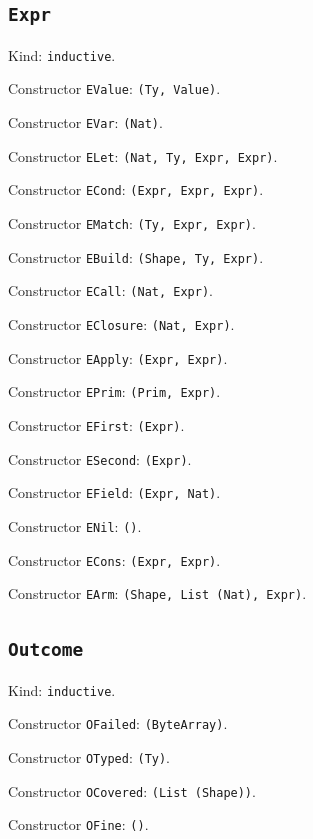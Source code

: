 \documentclass[11pt]{article}
\begin{document}
\subsection*{\texttt{Expr}}
\noindent Kind: \texttt{inductive}.\par
\noindent Constructor \texttt{EValue}: \texttt{(Ty, Value)}.\par
\noindent Constructor \texttt{EVar}: \texttt{(Nat)}.\par
\noindent Constructor \texttt{ELet}: \texttt{(Nat, Ty, Expr, Expr)}.\par
\noindent Constructor \texttt{ECond}: \texttt{(Expr, Expr, Expr)}.\par
\noindent Constructor \texttt{EMatch}: \texttt{(Ty, Expr, Expr)}.\par
\noindent Constructor \texttt{EBuild}: \texttt{(Shape, Ty, Expr)}.\par
\noindent Constructor \texttt{ECall}: \texttt{(Nat, Expr)}.\par
\noindent Constructor \texttt{EClosure}: \texttt{(Nat, Expr)}.\par
\noindent Constructor \texttt{EApply}: \texttt{(Expr, Expr)}.\par
\noindent Constructor \texttt{EPrim}: \texttt{(Prim, Expr)}.\par
\noindent Constructor \texttt{EFirst}: \texttt{(Expr)}.\par
\noindent Constructor \texttt{ESecond}: \texttt{(Expr)}.\par
\noindent Constructor \texttt{EField}: \texttt{(Expr, Nat)}.\par
\noindent Constructor \texttt{ENil}: \texttt{()}.\par
\noindent Constructor \texttt{ECons}: \texttt{(Expr, Expr)}.\par
\noindent Constructor \texttt{EArm}: \texttt{(Shape, List (Nat), Expr)}.\par
\subsection*{\texttt{Outcome}}
\noindent Kind: \texttt{inductive}.\par
\noindent Constructor \texttt{OFailed}: \texttt{(ByteArray)}.\par
\noindent Constructor \texttt{OTyped}: \texttt{(Ty)}.\par
\noindent Constructor \texttt{OCovered}: \texttt{(List (Shape))}.\par
\noindent Constructor \texttt{OFine}: \texttt{()}.\par
\end{document}
